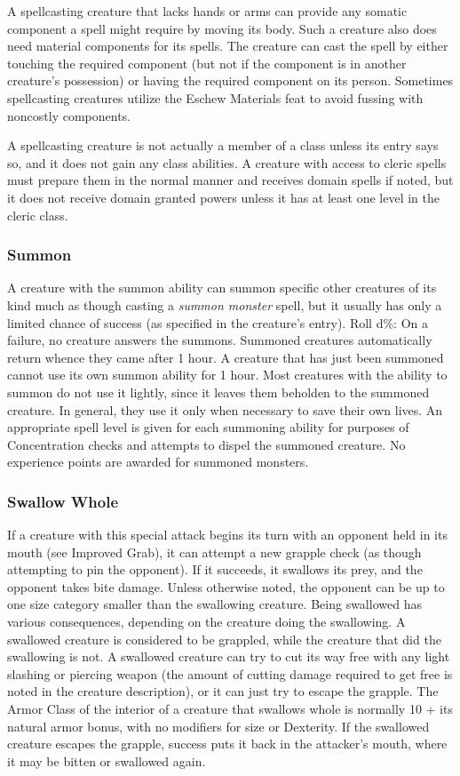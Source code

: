 A spellcasting creature that lacks hands or arms can provide any somatic component a spell might require by moving its body. Such a creature also does need material components for its spells. The creature can cast the spell by either touching the required component (but not if the component is in another creature's possession) or having the required component on its person. Sometimes spellcasting creatures utilize the Eschew Materials feat to avoid fussing with noncostly components.

A spellcasting creature is not actually a member of a class unless its entry says so, and it does not gain any class abilities. A creature with access to cleric spells must prepare them in the normal manner and receives domain spells if noted, but it does not receive domain granted powers unless it has at least one level in the cleric class.

\subsubsection{Summon}
A creature with the summon ability can summon specific other creatures of its kind much as though casting a \emph{summon monster} spell, but it usually has only a limited chance of success (as specified in the creature's entry). Roll d\%: On a failure, no creature answers the summons. Summoned creatures automatically return whence they came after 1 hour. A creature that has just been summoned cannot use its own summon ability for 1 hour. Most creatures with the ability to summon do not use it lightly, since it leaves them beholden to the summoned creature. In general, they use it only when necessary to save their own lives. An appropriate spell level is given for each summoning ability for purposes of Concentration checks and attempts to dispel the summoned creature. No experience points are awarded for summoned monsters.

\subsubsection{Swallow Whole}
If a creature with this special attack begins its turn with an opponent held in its mouth (see Improved Grab), it can attempt a new grapple check (as though attempting to pin the opponent). If it succeeds, it swallows its prey, and the opponent takes bite damage. Unless otherwise noted, the opponent can be up to one size category smaller than the swallowing creature. Being swallowed has various consequences, depending on the creature doing the swallowing. A swallowed creature is considered to be grappled, while the creature that did the swallowing is not. A swallowed creature can try to cut its way free with any light slashing or piercing weapon (the amount of cutting damage required to get free is noted in the creature description), or it can just try to escape the grapple. The Armor Class of the interior of a creature that swallows whole is normally 10 + \onehalf its natural armor bonus, with no modifiers for size or Dexterity. If the swallowed creature escapes the grapple, success puts it back in the attacker's mouth, where it may be bitten or swallowed again.

